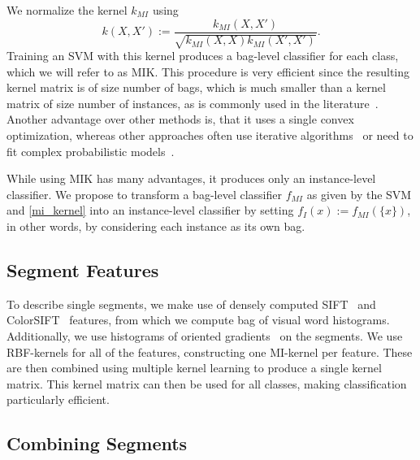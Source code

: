 We normalize the kernel $k_{MI}$ \citep{gaertner2002multi} using
\begin{equation}
k(X,X') := \frac{k_{MI}(X,X')}{\sqrt{k_{MI}(X,X)k_{MI}(X',X')}}.
\end{equation}
Training an SVM with this kernel produces a bag-level classifier for each
class, which we will refer to as MIK\@.  This procedure is very efficient since
the resulting kernel matrix is of size number of bags, which is much smaller
than a kernel matrix of size number of instances, as is commonly used in the
literature~\citep{andrews2003support,nguyen2010new,zhang2008m3miml}.  Another
advantage over other methods is, that it uses a single convex optimization,
whereas other approaches often use iterative
algorithms~\citep{andrews2003support} or need to fit complex probabilistic
models~\citep{zha2008joint}.

While using MIK has many advantages, it produces only an instance-level
classifier. We propose to transform a bag-level classifier $f_{MI}$ as given by
the SVM and \eqref{mi_kernel} into an instance-level classifier by setting
$f_{I}(x):=f_{MI}(\{x\})$, in other words, by considering each instance as its own
bag. 


\subsection{Segment Features}

To describe single segments, we make use of densely computed
SIFT~\citep{lowe2004distinctive} and ColorSIFT~\citep{van2009evaluating}
features, from which we compute bag of visual word histograms. Additionally, we
use histograms of oriented gradients~\citep{dalal2005histograms} on the
segments.  We use RBF-kernels for all of the features, constructing one
MI-kernel per feature. These are then combined using multiple kernel learning
to produce a single kernel matrix. This kernel matrix can then be used for all
classes, making classification particularly efficient.

\subsection{Combining Segments}

